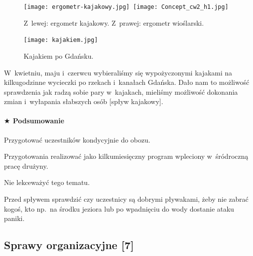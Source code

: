\documentclass[a5paper,10pt,titlepage,twoside]{article}
\newcommand*{\thecheckbox}{\hss$\Box$} %
\newenvironment*{checklist}
{\list{}{%
\renewcommand*{\makelabel}[1]{\thecheckbox}}}
{\endlist}
\begin{document}
{{\begin{description}
\begin{figure}[htp]
\centering
\texttt{[image: ergometr-kajakowy.jpg]}~\texttt{[image: Concept\_cw2\_h1.jpg]}
\caption[Caption for LOF]{Z~lewej: ergometr kajakowy. Z~prawej: ergometr wioślarski.\footnotemark}
\label{fig:ergometry}
\end{figure}
\begin{figure}[htp]
\centering
\texttt{[image: kajakiem.jpg]}
\caption[Caption for LOF]{Kajakiem po Gdańsku.\footnotemark}
\label{fig:kajakiem-po-gdansku}
\end{figure}
\item[kilkugodzinne wycieczki kajakami] W~kwietniu, maju i~czerwcu wybieraliśmy się wypożyczonymi kajakami na kilkugodzinne wycieczki po rzekach i~kanałach Gdańska. Dało nam to możliwość sprawdzenia jak radzą sobie pary w~kajakach, mieliśmy możliwość dokonania zmian i~wyłapania słabszych osób [spływ kajakowy].
\end{description}}}
\paragraph{$\bigstar$ Podsumowanie}
\begin{checklist}
\item Przygotować uczestników kondycyjnie do obozu.
\item Przygotowania realizować jako kilkumiesięczny program wpleciony w~śródroczną pracę drużyny.
\item Nie lekceważyć tego tematu.
\item Przed spływem sprawdzić czy uczestnicy są dobrymi pływakami, żeby nie zabrać kogoś, kto np.~na środku jeziora lub po wpadnięciu do wody dostanie ataku paniki.
\end{checklist}

\subsection{Sprawy organizacyjne [7]}
\end{document}
